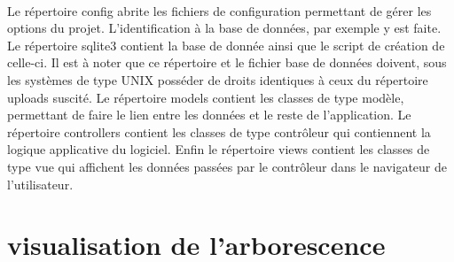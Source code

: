    \paragraph{}
        Le répertoire config abrite les fichiers de configuration permettant de
        gérer les options du projet.
        L'identification à la base de données, par exemple y est faite.
        Le répertoire sqlite3 contient la base de donnée ainsi que le script de
        création de celle-ci.
        Il est à noter que ce répertoire et le fichier base de données 
        doivent, sous les systèmes de type UNIX posséder de droits identiques 
        à ceux du répertoire uploads suscité.
        Le répertoire models contient les classes de type modèle, permettant
        de faire le lien entre les données et le reste de l'application.
        Le répertoire controllers contient les classes de type contrôleur qui
        contiennent la logique applicative du logiciel.
        Enfin le répertoire views contient les classes de type vue qui
        affichent les données passées par le contrôleur dans le navigateur de
        l'utilisateur.


\pagebreak
\section{visualisation de l'arborescence}

